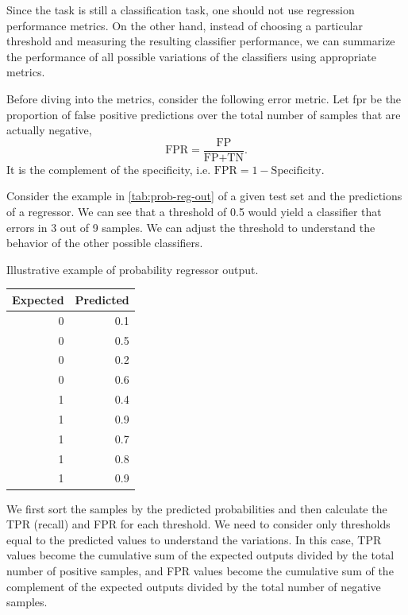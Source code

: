 Since the task is still a classification task, one should not use regression performance
metrics.  On the other hand, instead of choosing a particular threshold and measuring the
resulting \gls{classifier} performance, we can summarize the performance of all possible
variations of the \glspl{classifier} using appropriate metrics.

Before diving into the metrics, consider the following error metric.  Let \gls{fpr} be
the proportion of false positive predictions over the total number of samples that are
actually negative,
\begin{equation*}
  \text{FPR} = \frac{\text{FP}}{\text{FP} + \text{TN}}\text{.}
\end{equation*}
It is the complement of the specificity, i.e. $\text{FPR} = 1 - \text{Specificity}$.

Consider the example in \cref{tab:prob-reg-out} of a given test set and the predictions of
a \gls{regressor}. We can see that a threshold of 0.5 would yield a \gls{classifier} that errors
in 3 out of 9 samples.  We can adjust the threshold to understand the behavior of the
other possible \glspl{classifier}.

\begin{tablebox}[label=tab:prob-reg-out]{Illustrative example of probability \gls{regressor}
  output.}
  \centering
  \begin{tabular}{rr}
    \toprule
    \textbf{Expected} & \textbf{Predicted} \\
    \midrule
    0 & 0.1  \\
    0 & 0.5  \\
    0 & 0.2  \\
    0 & 0.6  \\
    1 & 0.4  \\
    1 & 0.9  \\
    1 & 0.7  \\
    1 & 0.8  \\
    1 & 0.9  \\
    \bottomrule
  \end{tabular}
\end{tablebox}

We first sort the samples by the predicted probabilities and then calculate the TPR
(recall) and FPR for each threshold.  We need to consider only thresholds equal to the
predicted values to understand the variations.  In this case, TPR values become the
cumulative sum of the expected outputs divided by the total number of positive samples,
and FPR values become the cumulative sum of the complement of the expected outputs
divided by the total number of negative samples.

